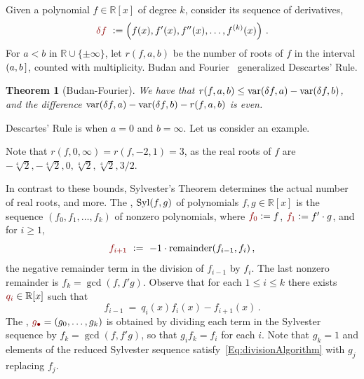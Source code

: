 \documentclass[12pt]{amsart}
\newtheorem{theorem}{Theorem}
\theoremstyle{definition}
\newcommand{\RR}{\mathbb{R}}
\DeclareMathOperator{\var}{{\rm var}}
\DeclareMathOperator{\Syl}{{\rm Syl}}
\newcommand{\defcolor}[1]{{\color{TAMU}#1}}
\newcommand{\demph}[1]{\defcolor{{\sl #1}}}
\begin{document}
Given a polynomial $f\in\RR[x]$ of degree $k$, consider its sequence of derivatives,
%
 \[
   \defcolor{\delta f}\ \vcentcolon= \left(f(x),f'(x),f''(x),\dots,f^{(k)}(x)\right)\,.
 \]
%
For $a<b$ in $\RR\cup\{\pm \infty\}$, let \defcolor{$r(f,a,b)$} be the number of roots of $f$ in the interval $(a,b\hspace{.05cm}]$, counted
with multiplicity.
Budan and Fourier~\cite[Ch.\ 2]{So_Book} generalized Descartes' Rule.

\begin{theorem}[Budan-Fourier]
  We have that $r(f,a,b)\leq \var(\delta f,a) -\var(\delta f,b)$, and the difference
  $\var(\delta f,a) -\var(\delta f,b)-r(f,a,b)$ is even. 
\end{theorem}

Descartes' Rule is when $a=0$ and $b=\infty$.
Let us consider an example.
%
\begin{leftbar}

\end{leftbar}
%
\noindent Note that $r(f,0,\infty)=r(f,-2,1)=3$, as the real roots of $f$ are $-\sqrt[4]{2},-\sqrt[4]{2},0,\sqrt[4]{2},\sqrt[4]{2},3/2$.

In contrast to these bounds, 
Sylvester's Theorem determines the actual number of real roots, and more.
The \demph{Sylvester sequence}, \defcolor{$\Syl(f,g)$} of polynomials $f,g\in\RR[x]$ is the sequence
$\left(f_0,f_1,\dotsc,f_k\right)$ of nonzero polynomials, where $\defcolor{f_0}\vcentcolon= f$, $\defcolor{f_1}\vcentcolon= f'\cdot g$,
and for $i\geq 1$, 
%
  \[
    \defcolor{f_{i+1}}\ \vcentcolon=\ -1\cdot \mbox{remainder}(f_{i-1},f_i)\,,
  \]
%
the negative remainder term in the division of $f_{i-1}$ by $f_i$.
The last nonzero remainder is $f_k = \gcd(f,f'g)$.
Observe that for each $1\leq i\leq k$ there exists $\defcolor{q_i}\in\RR[x]$ such that
%
 \begin{equation}\label{Eq:divisionAlgorithm}
    f_{i-1}\ =\ q_i(x)f_i(x)-f_{i+1}(x)\,.
 \end{equation}
%
The \demph{reduced Sylvester sequence}, $\defcolor{g_\bullet}=(g_0,\dotsc,g_k)$ is obtained by dividing each term in the Sylvester sequence
by $f_k=\gcd(f,f'g)$, so that $g_if_k=f_i$ for each $i$. 
Note that  $g_k=1$ and elements of the reduced Sylvester sequence satisfy~\eqref{Eq:divisionAlgorithm} with $g_j$ replacing $f_j$.
\end{document}
